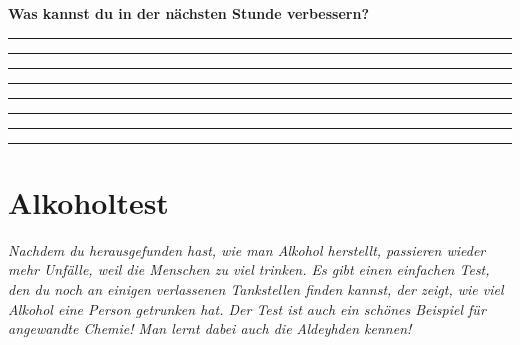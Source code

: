 \documentclass{scrartcl}  %
\begin{document}
\begin{center}
\begin{tcolorbox}
\begin{center}
\begin{tikzpicture}[scale=1]
							\end{tikzpicture}
						\end{center}
						\textbf{{\Large Was kannst du in der nächsten Stunde verbessern?}}
						\begin{center}
							\noindent\rule{12cm}{0.2pt}
							\vspace{1.1cm}
							\noindent\rule{12cm}{0.1pt}
							\vspace{1.1cm}
							\noindent\rule{12cm}{0.1pt}
							\vspace{1.1cm}
							\noindent\rule{12cm}{0.1pt}
							\vspace{1.1cm}
							\noindent\rule{12cm}{0.1pt}
							\vspace{1.1cm}
							\noindent\rule{12cm}{0.1pt}
							\vspace{1.1cm}
							\noindent\rule{12cm}{0.1pt}
							\vspace{1.1cm}
							\noindent\rule{12cm}{0.1pt}
						\end{center}
					\end{tcolorbox}
				\end{center}
								

				
\newpage
		\section{Alkoholtest}
		
			\textit{Nachdem du herausgefunden hast, wie man Alkohol herstellt, passieren wieder mehr Unfälle, weil die Menschen zu viel trinken. Es gibt einen einfachen Test, den du noch an einigen verlassenen Tankstellen finden kannst, der zeigt, wie viel Alkohol eine Person getrunken hat. Der Test ist auch ein schönes Beispiel für angewandte Chemie! Man lernt dabei auch die Aldeyhden kennen!} \newline
				
\end{document}
